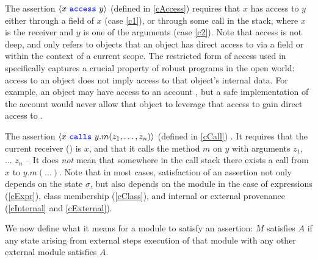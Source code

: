  
The assertion ${\langle x\ {\color{blue}\texttt{access}}\ y \rangle}$ (defined in  \ref{cAccess})
requires  that $x$ has access to $y$
either through a field of $x$ (case \ref{c1}),
or through some call in the stack, where $x$ is the receiver and $y$ is one of the
arguments (case \ref{c2}).
{Note that access is not deep, and only refers to objects that 
an object has direct access to via a field or within the context of a current scope. 
 The restricted form of access used in \Nec specifically captures a crucial property of robust programs in the open world: access to an object does not imply access to that object's internal data. For example, an object may have access to an account , but a safe implementation of the account would never allow that object to leverage that access to gain direct access to {}}.
 
 The assertion  %
 ${\langle x\ {\color{blue}\texttt{calls}}\ y.m(z_1, \ldots, z_n) \rangle}$  (defined in \ref{cCall})
. It
requires that the current receiver () is $x$, and that it calls the method $m$ on $y$ with
 arguments $z_1$, ... $z_n$ -- It does \emph{not} mean  that somewhere in the 
 call stack there exists a call from $x$ to $y.m(...)$. 
 Note that in most cases, satisfaction of an assertion not only depends on the state $\sigma$, but 
also depends on the module in the case of expressions (\ref{cExpr}), class membership
(\ref{cClass}), and internal or external provenance (\ref{cInternal} and \ref{cExternal}).


We now define what it means for a module to satisfy an assertion:
 $M$ satisfies  $A$ if any state arising from external steps execution of that
module with any other external module  satisfies $A$. 
 
